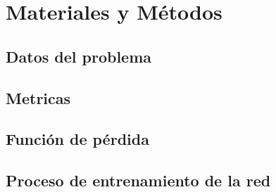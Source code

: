 \chapter{Materiales y Métodos}

    \section{Datos del problema}

    \section{Metricas}

    \section{Función de pérdida}

    \section{Proceso de entrenamiento de la red}
\endinput

